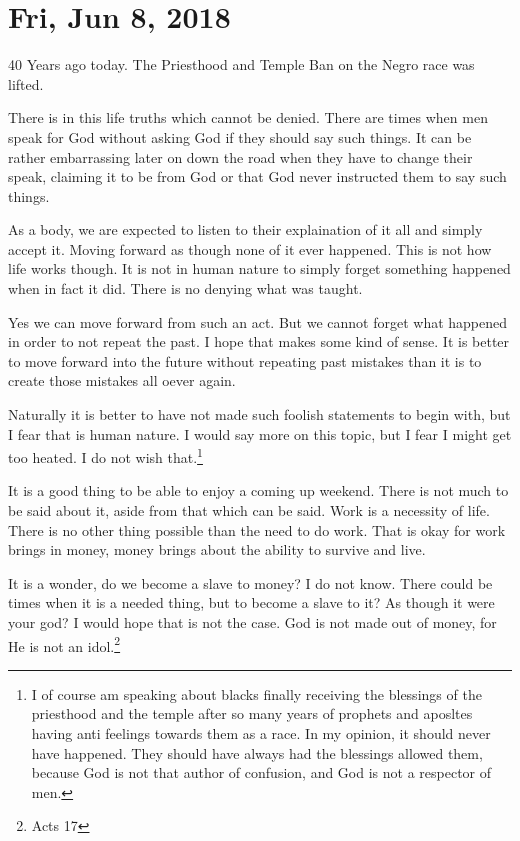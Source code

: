 \section{Fri, Jun 8, 2018}

40 Years ago today. The Priesthood and Temple Ban on the Negro race was lifted.

There is in this life truths which cannot be denied. There are times when men
speak for God without asking God if they should say such things. It can be
rather embarrassing later on down the road when they have to change their speak,
claiming it to be from God or that God never instructed them to say such things.

As a body, we are expected to listen to their explaination of it all and simply
accept it. Moving forward as though none of it ever happened. This is not how
life works though. It is not in human nature to simply forget something happened
when in fact it did. There is no denying what was taught.

Yes we can move forward from such an act. But we cannot forget what happened in
order to not repeat the past. I hope that makes some kind of sense. It is better
to move forward into the future without repeating past mistakes than it is to
create those mistakes all oever again.

Naturally it is better to have not made such foolish statements to begin with,
but I fear that is human nature. I would say more on this topic, but I fear I
might get too heated. I do not wish that.\footnote{I of course am speaking about
blacks finally receiving the blessings of the priesthood and the temple after
so many years of prophets and aposltes having anti feelings towards them as a 
race. In my opinion, it should never have happened. They should have always
had the blessings allowed them, because God is not that author of confusion,
and God is not a respector of men.}

It is a good thing to be able to enjoy a coming up weekend. There is not much to
be said about it, aside from that which can be said. Work is a necessity of
life. There is no other thing possible than the need to do work. That is okay
for work brings in money, money brings about the ability to survive and live.

It is a wonder, do we become a slave to money? I do not know. There could be
times when it is a needed thing, but to become a slave to it? As though it were
your god? I would hope that is not the case. God is not made out of money, for
He is not an idol.\footnote{Acts 17}

